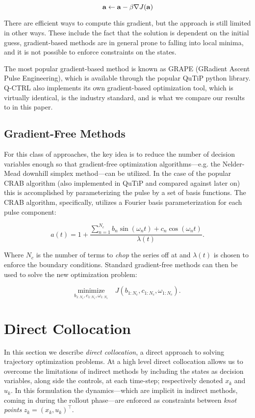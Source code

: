 \documentclass{article}
\newcommand{\minimize}[1]{\underset{#1}{\text{minimize}}}
\begin{document}
\begin{equation}
  \vb{a} \leftarrow \vb{a} - \beta \nabla J(\vb{a})
\end{equation}

There are efficient ways to compute this gradient, but the approach is still limited in other ways.  These include the fact that the solution is dependent on the initial guess, gradient-based methods are in general prone to falling into local minima, and it is not possible to enforce constraints on the states.

The most popular gradient-based method is known as GRAPE (GRadient Ascent Pulse Engineering), which is available through the popular QuTiP python library.  Q-CTRL also implements its own gradient-based optimization tool, which is virtually identical, is the industry standard, and is what we compare our results to in this paper.

\subsection{Gradient-Free Methods}
For this class of approaches, the key idea is to reduce the number of decision variables enough so that gradient-free optimization algorithms---e.g. the Nelder-Mead downhill simplex method---can be utilized. In the case of the popular CRAB algorithm (also implemented in QuTiP and compared against later on) this is accomplished by parameterizing the pulse by a set of basis functions.  The CRAB algorithm, specifically, utilizes a Fourier basis parameterization for each pulse component:

\begin{equation}
  a(t) = 1 + \frac{\sum_{n=1}^{N_c} b_n \sin(\omega_n t) + c_n \cos(\omega_n t)}{\lambda(t)}.
\end{equation}

\noindent
Where $N_c$ is the number of terms to \textit{chop} the series off at and $\lambda(t)$ is chosen to enforce the boundary conditions. Standard gradient-free methods can then be used to solve the new optimization problem:

\begin{equation}
  \minimize{b_{1:N_c}, c_{1:N_c}, \omega_{1:N_c}} \quad J(b_{1:N_c}, c_{1:N_c}, \omega_{1:N_c}).
\end{equation}
  


\newpage
\section{Direct Collocation}
In this section we describe \textit{direct collocation}, a direct approach to solving trajectory optimization problems.  At a high level direct collocation allows us to overcome the limitations of indirect methods by including the states as decision variables, along side the controls, at each time-step; respectively denoted $x_k$ and $u_k$.  In this formulation the dynamics---which are implicit in indirect methods, coming in during the rollout phase---are enforced as constraints between \textit{knot points} $z_k = (x_k, u_k)^\top$.  
\end{document}

